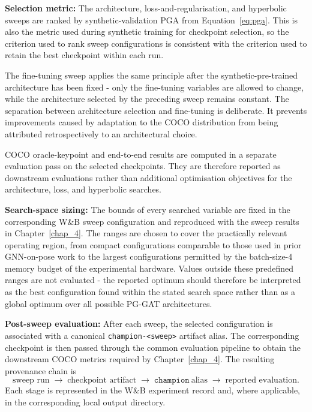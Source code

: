 \textbf{Selection metric:}
The architecture,
loss-and-regularisation,
and hyperbolic sweeps are ranked by synthetic-validation PGA
from Equation~\eqref{eq:pga}.
This is also the metric used during synthetic training
for checkpoint selection,
so the criterion used to rank sweep configurations is consistent
with the criterion used to retain the best checkpoint within each run.

The fine-tuning sweep applies the same principle after the
synthetic-pre-trained architecture has been fixed -
only the fine-tuning variables are allowed to change,
while the architecture selected by the preceding sweep remains constant.
The separation between architecture selection and fine-tuning is deliberate.
It prevents improvements caused by adaptation to the COCO distribution
from being attributed retrospectively to an architectural choice.

COCO oracle-keypoint and end-to-end results are computed
in a separate evaluation pass on the selected checkpoints.
They are therefore reported as downstream evaluations
rather than additional optimisation objectives for the architecture,
loss,
and hyperbolic searches.

\textbf{Search-space sizing:}
The bounds of every searched variable are fixed in the corresponding
W\&B sweep configuration and reproduced with the sweep results in
Chapter~\ref{chap_4}.
The ranges are chosen to cover the practically relevant operating region,
from compact configurations comparable to those used in prior
GNN-on-pose work
to the largest configurations permitted by the batch-size-$4$
memory budget of the experimental hardware.
Values outside these predefined ranges are not evaluated -
the reported optimum should therefore be interpreted as the best
configuration found within the stated search space
rather than as a global optimum over all possible PG-GAT architectures.

\textbf{Post-sweep evaluation:}
After each sweep,
the selected configuration is associated with a canonical
\texttt{champion-<sweep>} artifact alias.
The corresponding checkpoint is then passed through the common
evaluation pipeline to obtain the downstream COCO metrics required
by Chapter~\ref{chap_4}.
The resulting provenance chain is
\begin{equation}
    \text{sweep run}
    \;\longrightarrow\;
    \text{checkpoint artifact}
    \;\longrightarrow\;
    \texttt{champion}~\text{alias}
    \;\longrightarrow\;
    \text{reported evaluation}.
    \label{eq:sweep_provenance}
\end{equation}
Each stage is represented in the W\&B experiment record and,
where applicable,
in the corresponding local output directory.


